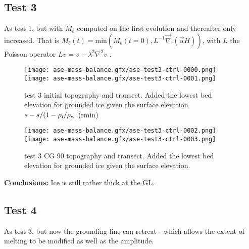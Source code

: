 \documentclass{article}
\begin{document}
\subsection{Test 3}

As test 1, but with $M_b$ computed on the first evolution and thereafter only increased. That is
$M_b(t) = \mbox{min}(M_b(t = 0), L^{-1} \vec{\nabla}. (\vec{u} H))$, with $L$ the Poisson operator
$L v = v - \lambda^2 \nabla^2 v$ .

\begin{figure}
\begin{center}
\texttt{[image: ase-mass-balance.gfx/ase-test3-ctrl-0000.png]}
\texttt{[image: ase-mass-balance.gfx/ase-test3-ctrl-0001.png]}
\end{center}
\caption{\protect{\label{fig::test1b}}} test 3 initial topography and transect.
Added the lowest bed elevation for grounded ice given the surface elevation 
$s - s/(1-\rho _{\rm i}/\rho _{\rm w}$ (rmin)
\end{figure}

\begin{figure}
\begin{center}
\texttt{[image: ase-mass-balance.gfx/ase-test3-ctrl-0002.png]}
\texttt{[image: ase-mass-balance.gfx/ase-test3-ctrl-0003.png]}
\end{center}
\caption{\protect{\label{fig::test1b}}} test 3 CG 90 topography and transect.
Added the lowest bed elevation for grounded ice given the surface elevation.
\end{figure}

{\large {\bf Conclusions:} Ice is still rather thick at the GL.}

\subsection{Test 4}

As test 3, but now the grounding line can retreat - which allows the extent of melting to be modified as well
as the amplitude.





\end{document}
